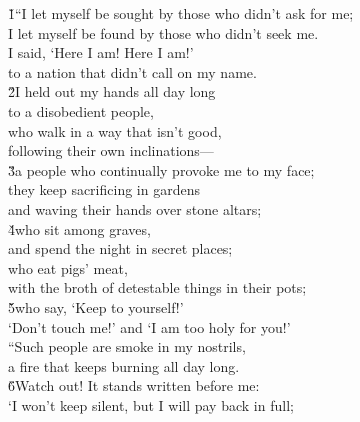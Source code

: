 \begin{poetry}
\poeml {}
\v{1}``I let myself be sought by those who didn't ask for me; \\
\poemll    I let myself be found by those who didn't seek me. \\
\poeml I said, `Here I am! Here I am!' \\
\poemll    to a nation that didn't call on my name. \\
\poeml \v{2}I held out my hands all day long \\
\poemll    to a disobedient people, \\
\poeml who walk in a way that isn't good, \\
\poemll    following their own inclinations--- \\
\poeml \v{3}a people who continually provoke me to my face; \\
\poemll    they keep sacrificing in gardens \\
\poemlll       and waving their hands over stone altars; \\
\poeml \v{4}who sit among graves, \\
\poemll    and spend the night in secret places; \\
\poeml who eat pigs' meat, \\
\poemll    with the broth of detestable things in their pots; \\
\poeml \v{5}who say, `Keep to yourself!' \\
\poemll    `Don't touch me!' and `I am too holy for you!' \\
\poeml ``Such people are smoke in my nostrils, \\
\poemll    a fire that keeps burning all day long. \\
\poeml \v{6}Watch out! It stands written before me: \\
\poemll    `I won't keep silent, but I will pay back in full; \\

\end{poetry}
